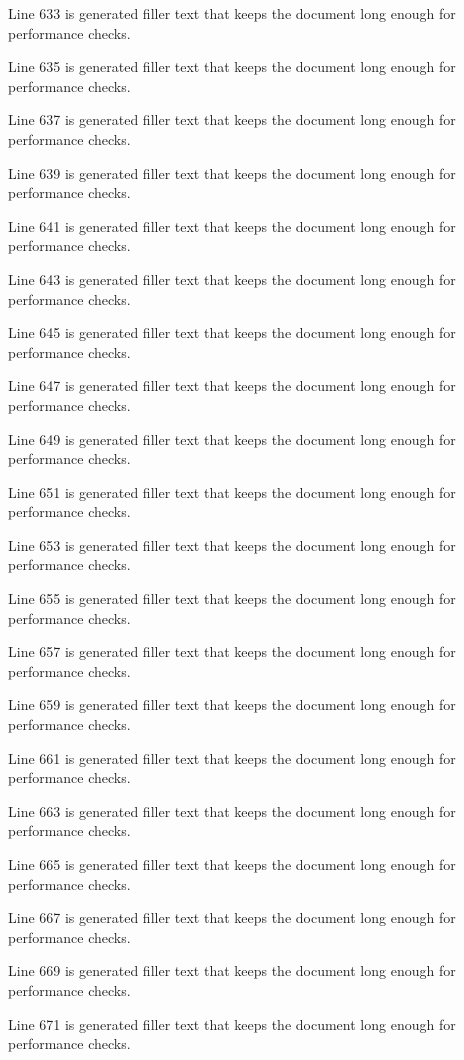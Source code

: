 Line 633 is generated filler text that keeps the document long enough for performance checks.

Line 635 is generated filler text that keeps the document long enough for performance checks.

Line 637 is generated filler text that keeps the document long enough for performance checks.

Line 639 is generated filler text that keeps the document long enough for performance checks.

Line 641 is generated filler text that keeps the document long enough for performance checks.

Line 643 is generated filler text that keeps the document long enough for performance checks.

Line 645 is generated filler text that keeps the document long enough for performance checks.

Line 647 is generated filler text that keeps the document long enough for performance checks.

Line 649 is generated filler text that keeps the document long enough for performance checks.

Line 651 is generated filler text that keeps the document long enough for performance checks.

Line 653 is generated filler text that keeps the document long enough for performance checks.

Line 655 is generated filler text that keeps the document long enough for performance checks.

Line 657 is generated filler text that keeps the document long enough for performance checks.

Line 659 is generated filler text that keeps the document long enough for performance checks.

Line 661 is generated filler text that keeps the document long enough for performance checks.

Line 663 is generated filler text that keeps the document long enough for performance checks.

Line 665 is generated filler text that keeps the document long enough for performance checks.

Line 667 is generated filler text that keeps the document long enough for performance checks.

Line 669 is generated filler text that keeps the document long enough for performance checks.

Line 671 is generated filler text that keeps the document long enough for performance checks.

